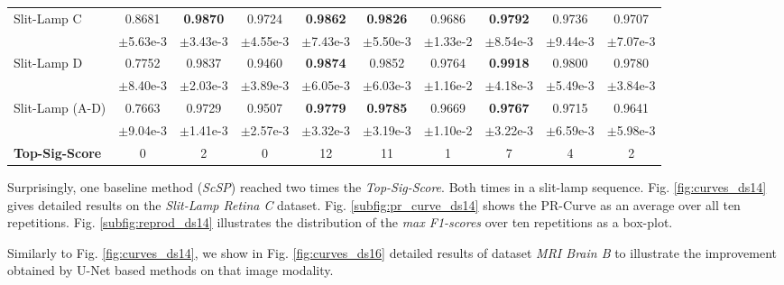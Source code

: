 \begin{table}[!htbp]
\begin{tabular}{l|*{9}{c|}}
      {\scriptsize Slit-Lamp C} & \scriptsize 0.8681 & {\color{red} \textbf{\scriptsize 0.9870}} & \scriptsize 0.9724 & \textbf{\scriptsize 0.9862} & \textbf{\scriptsize 0.9826} & \scriptsize 0.9686 & \textbf{\scriptsize 0.9792} & \scriptsize 0.9736 & \scriptsize 0.9707 \\[-4pt]
       & \tiny $\pm$5.63e-3 & \tiny $\pm$3.43e-3 & \tiny $\pm$4.55e-3 & \tiny $\pm$7.43e-3 & \tiny $\pm$5.50e-3 & \tiny $\pm$1.33e-2 & \tiny $\pm$8.54e-3 & \tiny $\pm$9.44e-3 & \tiny $\pm$7.07e-3 \\\midrule
      {\scriptsize Slit-Lamp D} & \scriptsize 0.7752 & \scriptsize 0.9837 & \scriptsize 0.9460 & \textbf{\scriptsize 0.9874} & \scriptsize 0.9852 & \scriptsize 0.9764 & {\color{red} \textbf{\scriptsize 0.9918}} & \scriptsize 0.9800 & \scriptsize 0.9780 \\[-4pt]
       & \tiny $\pm$8.40e-3 & \tiny $\pm$2.03e-3 & \tiny $\pm$3.89e-3 & \tiny $\pm$6.05e-3 & \tiny $\pm$6.03e-3 & \tiny $\pm$1.16e-2 & \tiny $\pm$4.18e-3 & \tiny $\pm$5.49e-3 & \tiny $\pm$3.84e-3 \\\midrule
      {\scriptsize Slit-Lamp (A-D)} & \scriptsize 0.7663 & \scriptsize 0.9729 & \scriptsize 0.9507 & \textbf{\scriptsize 0.9779} & {\color{red} \textbf{\scriptsize 0.9785}} & \scriptsize 0.9669 & \textbf{\scriptsize 0.9767} & \scriptsize 0.9715 & \scriptsize 0.9641 \\[-4pt]
       & \tiny $\pm$9.04e-3 & \tiny $\pm$1.41e-3 & \tiny $\pm$2.57e-3 & \tiny $\pm$3.32e-3 & \tiny $\pm$3.19e-3 & \tiny $\pm$1.10e-2 & \tiny $\pm$3.22e-3 & \tiny $\pm$6.59e-3 & \tiny $\pm$5.98e-3 \\\bottomrule\toprule
      {\scriptsize \textbf{Top-Sig-Score}} & 0 & 2 & 0 & 12 & 11 & 1 & 7 & 4 & 2 \\\bottomrule
   \end{tabular}
   \label{tab:final_results}
\end{table}

Surprisingly, one baseline method (\textit{ScSP}) reached two times the \textit{Top-Sig-Score}.
Both times in a slit-lamp sequence.
Fig. \ref{fig:curves_ds14} gives detailed results on the \textit{Slit-Lamp Retina C} dataset.
Fig. \ref{subfig:pr_curve_ds14} shows the PR-Curve as an average over all ten repetitions.
Fig. \ref{subfig:reprod_ds14} illustrates the distribution of the \textit{max F1-scores} over ten repetitions as a box-plot.

Similarly to Fig. \ref{fig:curves_ds14}, we show in Fig. \ref{fig:curves_ds16} detailed results of dataset \textit{MRI Brain B} to illustrate the improvement obtained by U-Net based methods on that image modality.

